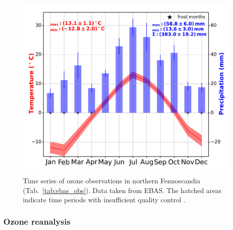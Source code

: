 \documentclass[bg, manuscript]{copernicus}
\begin{document}
\begin{figure}[t]
  \includegraphics[width=12cm]{fig04}
  \caption{Time series of ozone observations in northern Fennoscandia (Tab.~\ref{tab:ebas_obs}). Data taken from EBAS. The hatched areas indicate time periods with insufficient quality control \citep{NILU2003}.}
  \label{fig:ozone_timesseries_fenoscandic_obs}
\end{figure}

\subsubsection{Ozone reanalysis}
\label{subsubsec:ozone_rea}
\end{document}
